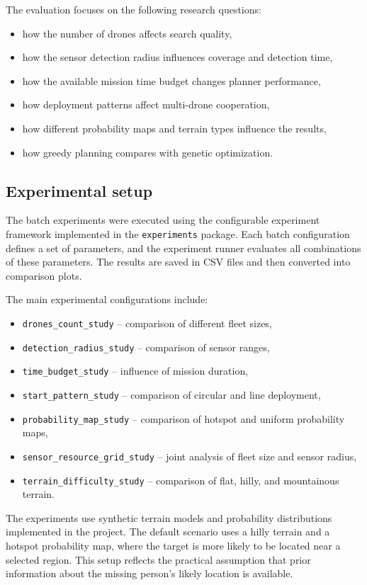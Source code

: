 \documentclass[english]{projectreport}
\begin{document}
The evaluation focuses on the following research questions:
\begin{itemize}
    \item how the number of drones affects search quality,
    \item how the sensor detection radius influences coverage and detection time,
    \item how the available mission time budget changes planner performance,
    \item how deployment patterns affect multi-drone cooperation,
    \item how different probability maps and terrain types influence the results,
    \item how greedy planning compares with genetic optimization.
\end{itemize}

\subsection{Experimental setup}

The batch experiments were executed using the configurable experiment framework
implemented in the \texttt{experiments} package. Each batch configuration defines
a set of parameters, and the experiment runner evaluates all combinations of
these parameters. The results are saved in CSV files and then converted into
comparison plots.

The main experimental configurations include:
\begin{itemize}
    \item \texttt{drones\_count\_study} -- comparison of different fleet sizes,
    \item \texttt{detection\_radius\_study} -- comparison of sensor ranges,
    \item \texttt{time\_budget\_study} -- influence of mission duration,
    \item \texttt{start\_pattern\_study} -- comparison of circular and line deployment,
    \item \texttt{probability\_map\_study} -- comparison of hotspot and uniform probability maps,
    \item \texttt{sensor\_resource\_grid\_study} -- joint analysis of fleet size and sensor radius,
    \item \texttt{terrain\_difficulty\_study} -- comparison of flat, hilly, and mountainous terrain.
\end{itemize}

The experiments use synthetic terrain models and probability distributions
implemented in the project. The default scenario uses a hilly terrain and a
hotspot probability map, where the target is more likely to be located near a
selected region. This setup reflects the practical assumption that prior
information about the missing person's likely location is available.
\end{document}
